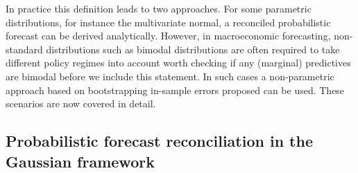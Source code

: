 \documentclass[graybox]{svmult}
\begin{document}
In practice this definition leads to two approaches.  For some parametric distributions, for instance the multivariate normal,  a reconciled probabilistic forecast can be derived analytically.  However, in macroeconomic forecasting, non-standard distributions such as bimodal distributions are often required to take different policy regimes into account {\color{red} worth checking if any (marginal) predictives are bimodal before we include this statement}.  In such cases a non-parametric approach based on bootstrapping in-sample errors proposed \cite{Gamakumara2018} can be used.  These scenarios are now covered in detail.

\subsection{Probabilistic forecast reconciliation in the Gaussian framework}\label{sec:probrecgauss}


\end{document}
